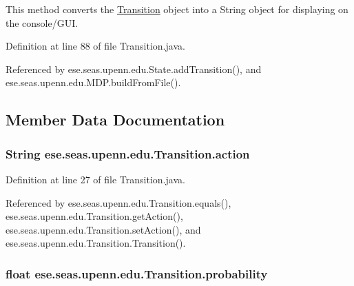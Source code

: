 This method converts the \hyperlink{classese_1_1seas_1_1upenn_1_1edu_1_1_transition}{Transition} object into a String object for displaying on the console/\+G\+U\+I. 



Definition at line 88 of file Transition.\+java.



Referenced by ese.\+seas.\+upenn.\+edu.\+State.\+add\+Transition(), and ese.\+seas.\+upenn.\+edu.\+M\+D\+P.\+build\+From\+File().



\subsection{Member Data Documentation}
\hypertarget{classese_1_1seas_1_1upenn_1_1edu_1_1_transition_a8c04b30e9c745a0d3e0420c3ae80f77a}{}
\subsubsection[{action}]{\setlength{\rightskip}{0pt plus 5cm}String ese.\+seas.\+upenn.\+edu.\+Transition.\+action\hspace{0.3cm}{\ttfamily [private]}}\label{classese_1_1seas_1_1upenn_1_1edu_1_1_transition_a8c04b30e9c745a0d3e0420c3ae80f77a}


Definition at line 27 of file Transition.\+java.



Referenced by ese.\+seas.\+upenn.\+edu.\+Transition.\+equals(), ese.\+seas.\+upenn.\+edu.\+Transition.\+get\+Action(), ese.\+seas.\+upenn.\+edu.\+Transition.\+set\+Action(), and ese.\+seas.\+upenn.\+edu.\+Transition.\+Transition().

\hypertarget{classese_1_1seas_1_1upenn_1_1edu_1_1_transition_a1972203fb78b0b9a43d758e5b127a04d}{}
\subsubsection[{probability}]{\setlength{\rightskip}{0pt plus 5cm}float ese.\+seas.\+upenn.\+edu.\+Transition.\+probability\hspace{0.3cm}{\ttfamily [private]}}\label{classese_1_1seas_1_1upenn_1_1edu_1_1_transition_a1972203fb78b0b9a43d758e5b127a04d}


